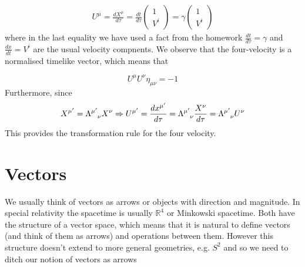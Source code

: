\documentclass[11pt]{article}
\theoremstyle{plain}
\begin{document}
\begin{align*}
U^{\mu} = \frac{d X^{\mu}}{d \tau} = \frac{d t}{d \tau} 
	\begin{pmatrix}
		1 \\
		V^{i} 
	\end{pmatrix} = \gamma	\begin{pmatrix}
							1 \\
							V^{i} 
							\end{pmatrix}
\end{align*}
where in the last equality we have used a fact from the homework $\frac{d t}{d \tau} = \gamma$ and $\frac{d x}{d t} =V^{i}$ are the usual velocity compnents.
We observe that the four-velocity is a normalised timelike vector, which means that 

\begin{equation}
U^{\mu} U^{\nu} \eta_{\mu \nu} = -1
\end{equation}
Furthermore, since 
\begin{equation}
X^{\mu'} = \tensor{\Lambda}{^{\mu'}_\nu} X^{\nu} \Rightarrow U^{\mu'} = \frac{d x^{\mu '}}{d \tau} = \tensor{\Lambda}{^{\mu'}_\nu} \frac{X^{\nu}}{d \tau} =  \tensor{\Lambda}{^{\mu'}_\nu} U^{\nu} \label{eq0}
\end{equation}
This provides the transformation rule for the four velocity.



\newpage


\section{Vectors}


We usually think of vectors as arrows or objects with direction and magnitude. In special relativity the spacetime is usually $\mathbb{R}^{4}$ or Minkowski spacetime. Both have the structure of a vector space, which means that it is natural to define vectors (and think of them as arrows) and operations between them. However this structure doesn’t extend to more general geometries, e.g. $S^{2}$ and so we need to ditch our notion of vectors as arrows
\end{document}
